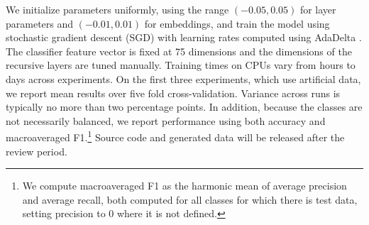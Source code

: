 We initialize parameters uniformly, using the range $(-0.05, 0.05)$ for layer parameters
and $(-0.01, 0.01)$ for embeddings, and train the model using stochastic gradient descent (SGD)
with learning rates computed using AdaDelta \cite{zeiler2012adadelta}.
The classifier feature vector is fixed at 75 dimensions and 
the dimensions of the recursive layers are tuned manually.
Training times on CPUs vary from hours to days across experiments.
On the first three experiments, which use artificial data, we report mean
results over five fold cross-validation.
Variance across runs is typically no
more than two percentage points. In addition, because the classes are not necessarily balanced, 
we report performance 
using both accuracy and macroaveraged F1.\footnote{We compute macroaveraged F1 
as the harmonic mean of average precision and average recall, both computed
for all classes for which there is test data, setting precision to 0 
where it is not defined.}
Source code and generated data will be released after the review period.

